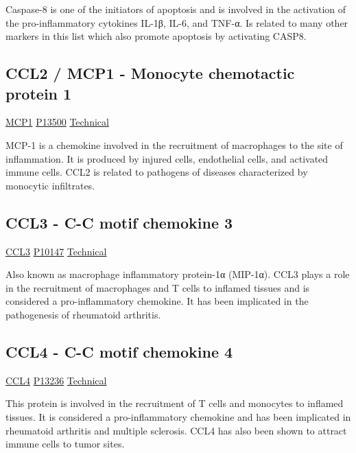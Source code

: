 Caspase-8 is one of the initiators of apoptosis and is involved in the activation of the pro-inflammatory cytokines IL-1β, IL-6, and TNF-α. Is related to many other markers in this list which also promote apoptosis by activating CASP8.

\subsection{CCL2 / MCP1 - Monocyte chemotactic protein 1}

\href{https://en.wikipedia.org/wiki/CCL2}{MCP1}
\href{http://www.uniprot.org/uniprot/P80075}{P13500}
\href{https://olink.com/products-services/target/protein/?assayID=5086}{Technical}

MCP-1 is a chemokine involved in the recruitment of macrophages to the site of inflammation. It is produced by injured cells, endothelial cells, and activated immune cells. CCL2 is related to pathogens of diseases characterized by monocytic infiltrates.

\subsection{CCL3 - C-C motif chemokine 3}

\href{https://en.wikipedia.org/wiki/CCL3}{CCL3}
\href{http://www.uniprot.org/uniprot/P10147}{P10147}
\href{https://olink.com/products-services/target/protein/?assayID=5097}{Technical}

Also known as macrophage inflammatory protein-1α (MIP-1α). CCL3 plays a role in the recruitment of macrophages and T cells to inflamed tissues and is considered a pro-inflammatory chemokine. It has been implicated in the pathogenesis of rheumatoid arthritis.

\subsection{CCL4 - C-C motif chemokine 4}

\href{https://en.wikipedia.org/wiki/CCL4}{CCL4}
\href{http://www.uniprot.org/uniprot/P13236}{P13236}
\href{https://olink.com/products-services/target/protein/?assayID=5048}{Technical}

This protein is involved in the recruitment of T cells and monocytes to inflamed tissues. It is considered a pro-inflammatory chemokine and has been implicated in  rheumatoid arthritis and multiple sclerosis. CCL4 has also been shown to attract immune cells to tumor sites.

